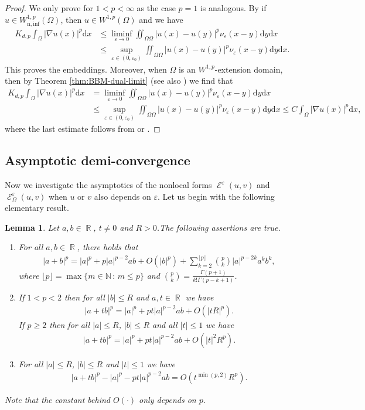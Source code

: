 \documentclass[12pt, reqno]{amsart}%
\theoremstyle{plain}  %
\newtheorem{lemma}[theorem]{Lemma}
\theoremstyle{definition}  %
\numberwithin{equation}{section}
\DeclareMathOperator{\cE}{\mathcal{E}}
\DeclareMathOperator{\R}{\mathbb{R}}
\newcommand{\iil}{\iint}
\renewcommand{\d}{\mathrm{d}}
\newcommand{\eps}{\varepsilon}
\begin{document}
\begin{proof}
We only prove for $1<p<\infty$ as the case $p=1$ is analogous. By \cite[Theorem 3.3]{Fog23}  if $u\in W^{1,p}_{\mathrm{n,inf}} (\Omega)$, then $u\in W^{1,p}  (\Omega)$ and we have
\begin{align*}
K_{d,p}\int_\Omega|\nabla u(x)|^p\d x
&\leq  \liminf_{\eps\to 0} \iil_{ \Omega \Omega}|u(x)-u(y)|^p\nu_\eps(x-y)\d y \d x\\
&\leq  \sup_{\eps\in (0,\eps_0)} \iil_{ \Omega \Omega}|u(x)-u(y)|^p\nu_\eps(x-y)\d y \d x.
\end{align*}
This proves the embeddings. Moreover, when $\Omega$ is an $W^{1,p}$-extension domain, then by Theorem \ref{thm:BBM-dual-limit} (see also \cite[Theorem 1.3]{Fog23}) we find that
\begin{align*}
K_{d,p}\int_\Omega|\nabla u(x)|^p\d x
&=\liminf_{\eps\to 0} \iil_{ \Omega \Omega}|u(x)-u(y)|^p\nu_\eps(x-y)\d y \d x\\
&\leq  \sup_{\eps\in (0,\eps_0)} \iil_{ \Omega \Omega}|u(x)-u(y)|^p\nu_\eps(x-y)\d y \d x \leq C \int_\Omega|\nabla u(x)|^p\d x,
\end{align*}
where the last estimate follows from \cite[Lemma 3.47]{guy-thesis} or \cite[Lemma  2.12]{Fog23}.
\end{proof}

\subsection{Asymptotic demi-convergence}
Now we investigate the asymptotics of the nonlocal forms $\cE^\eps(u,v)$ and $\cE^\eps_\Omega(u,v)$ when $u$ or $v$ also depends on $\eps$.  Let us begin with the following elementary result.
\begin{lemma}\label{lem:elem-taylor-expan}
Let   $a,b\in \R$,  $t\neq 0$ and $R>0$.The following assertions are true.
\begin{enumerate}
\item For all  $a,b\in \R$, there holds that
\begin{align*}
|a+b|^p= |a|^p+ p|a|^{p-2}ab+O(|b|^p)+ \sum_{k=2}^{\lfloor p\rfloor}\binom{p}{k}|a|^{p-2k} a^{k}b^{k},
\end{align*}
where $\lfloor p\rfloor=\max\{m\in\mathbb{N}\,:\, m\leq p\}$ and $\binom{p}{k}=\frac{\Gamma(p+1)}{k!\Gamma(p-k+1)}$.
\item  If $1<p< 2$ then for  all $|b|\leq R$  and $a, t\in \R$  we have
\begin{align*}
|a+tb|^p=|a|^p+ pt|a|^{p-2}ab+O(|tR|^p).
\end{align*}
If $p\geq 2$ then for all $|a|\leq R$, $|b|\leq R$ and all $|t|\leq 1$ we have
\begin{align*}
|a+tb|^p=|a|^p+ pt|a|^{p-2}ab+O(|t|^2R^p).
\end{align*}
\item
For all $|a|\leq R$,  $|b|\leq R$ and $|t|\leq 1$ we have
\begin{align*}
|a+tb|^p- |a|^p- pt|a|^{p-2}ab= O(t^{\min(p,2)}R^p).
\end{align*}
\end{enumerate}
Note that the constant behind $O(\cdot)$ only depends on $p$.
\end{lemma}
\end{document}
